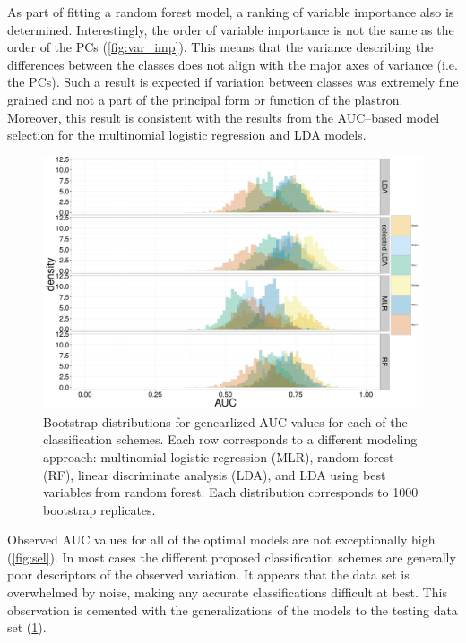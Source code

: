 \documentclass[12pt,letterpaper]{article}
\begin{document}
As part of fitting a random forest model, a ranking of variable importance also is determined. Interestingly, the order of variable importance is not the same as the order of the PCs (\ref{fig:var_imp}). This means that the variance describing the differences between the classes does not align with the major axes of variance (i.e. the PCs). Such a result is expected if variation between classes was extremely fine grained and not a part of the principal form or function of the plastron. Moreover, this result is consistent with the results from the AUC--based model selection for the multinomial logistic regression and LDA models.

\begin{figure}[ht]
  \centering
  \includegraphics[height = 0.5\textheight, width = \textwidth, keepaspectratio = true]{figure/gen_res}
  \caption{Bootstrap distributions for genearlized AUC values for each of the classification schemes. Each row corresponds to a different modeling approach: multinomial logistic regression (MLR), random forest (RF), linear discriminate analysis (LDA), and LDA using best variables from random forest. Each distribution corresponds to 1000 bootstrap replicates.}
  \label{fig:gen_hist}
\end{figure}

Observed AUC values for all of the optimal models are not exceptionally high (\ref{fig:sel}). In most cases the different proposed classification schemes are generally poor descriptors of the observed variation. It appears that the data set is overwhelmed by noise, making any accurate classifications difficult at best. This observation is cemented with the generalizations of the models to the testing data set (\ref{fig:gen_hist}).
\end{document}
